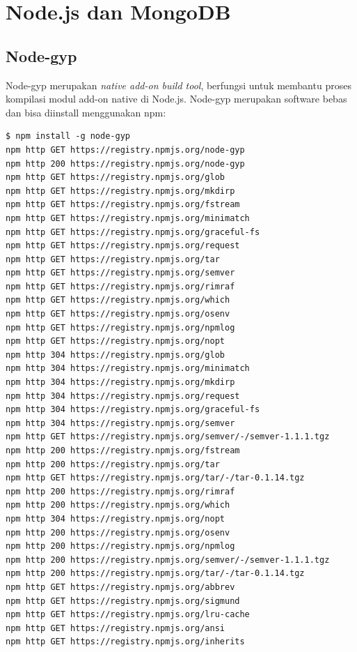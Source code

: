 \section{Node.js dan MongoDB}

\subsection{Node-gyp}

Node-gyp merupakan \textit{native add-on build tool}, berfungsi untuk membantu proses kompilasi modul add-on native di Node.js. Node-gyp merupakan software bebas dan bisa diinstall menggunakan npm:

\lstset{language=bash,caption=Instalasi node-gyp}
\begin{lstlisting}
$ npm install -g node-gyp
npm http GET https://registry.npmjs.org/node-gyp
npm http 200 https://registry.npmjs.org/node-gyp
npm http GET https://registry.npmjs.org/glob
npm http GET https://registry.npmjs.org/mkdirp
npm http GET https://registry.npmjs.org/fstream
npm http GET https://registry.npmjs.org/minimatch
npm http GET https://registry.npmjs.org/graceful-fs
npm http GET https://registry.npmjs.org/request
npm http GET https://registry.npmjs.org/tar
npm http GET https://registry.npmjs.org/semver
npm http GET https://registry.npmjs.org/rimraf
npm http GET https://registry.npmjs.org/which
npm http GET https://registry.npmjs.org/osenv
npm http GET https://registry.npmjs.org/npmlog
npm http GET https://registry.npmjs.org/nopt
npm http 304 https://registry.npmjs.org/glob
npm http 304 https://registry.npmjs.org/minimatch
npm http 304 https://registry.npmjs.org/mkdirp
npm http 304 https://registry.npmjs.org/request
npm http 304 https://registry.npmjs.org/graceful-fs
npm http 304 https://registry.npmjs.org/semver
npm http GET https://registry.npmjs.org/semver/-/semver-1.1.1.tgz
npm http 200 https://registry.npmjs.org/fstream
npm http 200 https://registry.npmjs.org/tar
npm http GET https://registry.npmjs.org/tar/-/tar-0.1.14.tgz
npm http 200 https://registry.npmjs.org/rimraf
npm http 200 https://registry.npmjs.org/which
npm http 304 https://registry.npmjs.org/nopt
npm http 200 https://registry.npmjs.org/osenv
npm http 200 https://registry.npmjs.org/npmlog
npm http 200 https://registry.npmjs.org/semver/-/semver-1.1.1.tgz
npm http 200 https://registry.npmjs.org/tar/-/tar-0.1.14.tgz
npm http GET https://registry.npmjs.org/abbrev
npm http GET https://registry.npmjs.org/sigmund
npm http GET https://registry.npmjs.org/lru-cache
npm http GET https://registry.npmjs.org/ansi
npm http GET https://registry.npmjs.org/inherits

\end{lstlisting}
